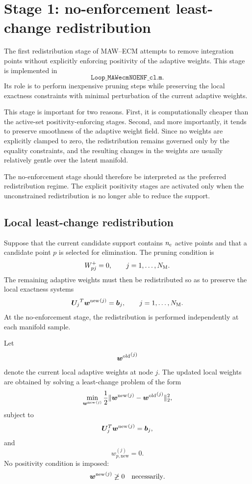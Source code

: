 \documentclass[11pt,a4paper]{article}
\begin{document}
\section{Stage 1: no-enforcement least-change redistribution}
\label{sec:no_enforcement_stage}

The first redistribution stage of MAW--ECM attempts to remove integration
points without explicitly enforcing positivity of the adaptive weights. This
stage is implemented in
\[
        \texttt{Loop\_MAWecmNOENF\_cl.m}.
\]
Its role is to perform inexpensive pruning steps while preserving the local
exactness constraints with minimal perturbation of the current adaptive
weights.

This stage is important for two reasons. First, it is computationally cheaper
than the active-set positivity-enforcing stages. Second, and more importantly,
it tends to preserve smoothness of the adaptive weight field. Since no weights
are explicitly clamped to zero, the redistribution remains governed only by the
equality constraints, and the resulting changes in the weights are usually
relatively gentle over the latent manifold.

The no-enforcement stage should therefore be interpreted as the preferred
redistribution regime. The explicit positivity stages are activated only when
the unconstrained redistribution is no longer able to reduce the support.

\subsection{Local least-change redistribution}

Suppose that the current candidate support contains $n_{\mathrm{c}}$ active points and
that a candidate point $p$ is selected for elimination. The pruning condition
is
\[
        W_{pj}^{+}=0,
        \qquad
        j=1,\ldots,N_{\mathrm{M}}.
\]
The remaining adaptive weights must then be redistributed so as to preserve the
local exactness systems
\[
        {\bm U_j}^T{\bm w^{\mathrm{new}}}^{(j)}=\bm b_j,
        \qquad
        j=1,\ldots,N_{\mathrm{M}}.
\]
At the no-enforcement stage, the redistribution is performed independently at
each manifold sample.

Let
\[
        {\bm w^{\mathrm{old}}}^{(j)}
\]
denote the current local adaptive weights at node $j$. The updated local
weights are obtained by solving a least-change problem of the form
\[
        \min_{{\bm w^{\mathrm{new}}}^{(j)}}
        \frac{1}{2}
        \|
        {\bm w^{\mathrm{new}}}^{(j)}-{\bm w^{\mathrm{old}}}^{(j)}
        \|_2^2,
        \label{eq:no_enforcement_objective}
\]
subject to
\[
        \bm U_j^T{\bm w^{\mathrm{new}}}^{(j)}=\bm b_j,
        \label{eq:no_enforcement_exactness}
\]
and
\[
        w_{p,\mathrm{new}}^{(j)}=0.
        \label{eq:no_enforcement_elimination}
\]
No positivity condition is imposed:
\[
        {\bm w^{\mathrm{new}}}^{(j)}
        \not\geq 0
        \quad\text{necessarily}.
\]
\end{document}
